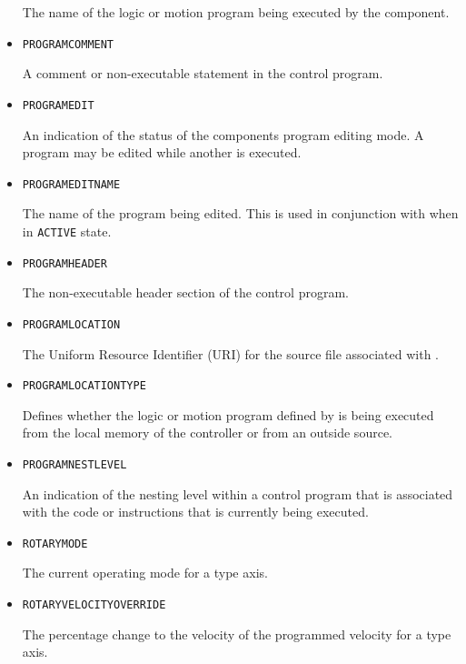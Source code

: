 \begin{itemize}
The name of the logic or motion program being executed by the  component.


\item \texttt{PROGRAM\textunderscore COMMENT}  

A comment or non-executable statement in the control program.


\item \texttt{PROGRAM\textunderscore EDIT}  

An indication of the status of the  components program editing mode. A program may be edited while another is executed.


\item \texttt{PROGRAM\textunderscore EDIT\textunderscore NAME}  

The name of the program being edited. 
 This is used in conjunction with  when in \texttt{ACTIVE} state. 


\item \texttt{PROGRAM\textunderscore HEADER}  

The non-executable header section of the control program.


\item \texttt{PROGRAM\textunderscore LOCATION}  

The Uniform Resource Identifier (URI) for the source file associated with .


\item \texttt{PROGRAM\textunderscore LOCATION\textunderscore TYPE}  

Defines whether the logic or motion program defined by  is being executed from the local memory of the controller or from an outside source.


\item \texttt{PROGRAM\textunderscore NEST\textunderscore LEVEL}  

An indication of the nesting level within a control program that is associated with the code or instructions that is currently being executed.


\item \texttt{ROTARY\textunderscore MODE}  

The current operating mode for a  type axis.


\item \texttt{ROTARY\textunderscore VELOCITY\textunderscore OVERRIDE}  

The percentage change to the velocity of the programmed velocity for a  type axis.



\end{itemize}
